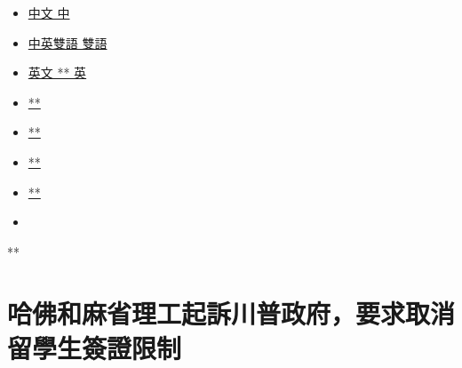 \begin{itemize}
\tightlist
\item
  \href{javascript:;}{中文 中}
\item
  \href{/usa/20200709/harvard-mit-trump-ice-students/zh-hant/dual/}{中英雙語
  雙語}
\item
  \href{https://www.nytimes.com/2020/07/08/us/harvard-mit-trump-ice-students.html}{英文
  ** 英}
\end{itemize}

\begin{itemize}
\item
  \href{http://v.t.sina.com.cn/share/share.php?\&title=\%E5\%93\%88\%E4\%BD\%9B\%E5\%92\%8C\%E9\%BA\%BB\%E7\%9C\%81\%E7\%90\%86\%E5\%B7\%A5\%E8\%B5\%B7\%E8\%A8\%B4\%E5\%B7\%9D\%E6\%99\%AE\%E6\%94\%BF\%E5\%BA\%9C\%EF\%BC\%8C\%E8\%A6\%81\%E6\%B1\%82\%E5\%8F\%96\%E6\%B6\%88\%E7\%95\%99\%E5\%AD\%B8\%E7\%94\%9F\%E7\%B0\%BD\%E8\%AD\%89\%E9\%99\%90\%E5\%88\%B6\&url=https://cn.nytimes.com/usa/20200709/harvard-mit-trump-ice-students/zh-hant/}{**}
\item
  \href{https://www.facebook.com/sharer/sharer.php?u=https://cn.nytimes.com/usa/20200709/harvard-mit-trump-ice-students/zh-hant/}{**}
\item
  \href{https://plus.google.com/share?url=https://cn.nytimes.com/usa/20200709/harvard-mit-trump-ice-students/zh-hant/}{**}
\item
  \href{https://twitter.com/share?text=\%E5\%93\%88\%E4\%BD\%9B\%E5\%92\%8C\%E9\%BA\%BB\%E7\%9C\%81\%E7\%90\%86\%E5\%B7\%A5\%E8\%B5\%B7\%E8\%A8\%B4\%E5\%B7\%9D\%E6\%99\%AE\%E6\%94\%BF\%E5\%BA\%9C\%EF\%BC\%8C\%E8\%A6\%81\%E6\%B1\%82\%E5\%8F\%96\%E6\%B6\%88\%E7\%95\%99\%E5\%AD\%B8\%E7\%94\%9F\%E7\%B0\%BD\%E8\%AD\%89\%E9\%99\%90\%E5\%88\%B6\&url=https://cn.nytimes.com/usa/20200709/harvard-mit-trump-ice-students/zh-hant/}{**}
\item
\end{itemize}

**

\hypertarget{ux54c8ux4f5bux548cux9ebbux7701ux7406ux5de5ux8d77ux8a34ux5dddux666eux653fux5e9cux8981ux6c42ux53d6ux6d88ux7559ux5b78ux751fux7c3dux8b49ux9650ux5236}{%
\section{哈佛和麻省理工起訴川普政府，要求取消留學生簽證限制}\label{ux54c8ux4f5bux548cux9ebbux7701ux7406ux5de5ux8d77ux8a34ux5dddux666eux653fux5e9cux8981ux6c42ux53d6ux6d88ux7559ux5b78ux751fux7c3dux8b49ux9650ux5236}}

